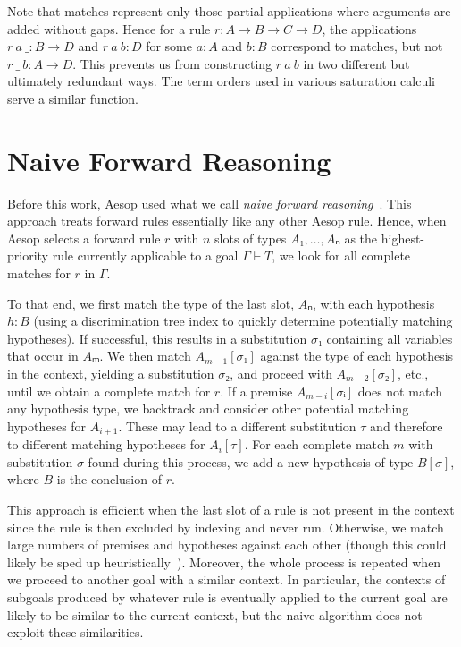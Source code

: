 \documentclass[runningheads,leqno]{llncs}
\begin{document}
Note that matches represent only those partial applications where arguments are added without gaps.
Hence for a rule $r : A → B → C → D$, the applications $r~a~\_ : B \to D$ and $r~a~b : D$ for some $a : A$ and $b : B$ correspond to matches, but not $r~\_~b : A \to D$.
This prevents us from constructing $r~a~b$ in two different but ultimately redundant ways.
The term orders used in various saturation calculi serve a similar function.

\section{Naive Forward Reasoning}%
\label{sec:naive}

Before this work, Aesop used what we call \emph{naive forward reasoning}~\cite{Aesop}.
This approach treats forward rules essentially like any other Aesop rule.
Hence, when Aesop selects a forward rule $r$ with $n$ slots of types $A₁, \dots, Aₙ$ as the highest-priority rule currently applicable to a goal $Γ ⊢ T$, we look for all complete matches for $r$ in $Γ$.

To that end, we first match the type of the last slot, $Aₙ$, with each hypothesis $h : B$ (using a discrimination tree index to quickly determine potentially matching hypotheses).
If successful, this results in a substitution $σ₁$ containing all variables that occur in $Aₘ$.
We then match $A_{m-1}[σ₁]$ against the type of each hypothesis in the context, yielding a substitution $σ₂$, and proceed with $A_{m-2}[σ₂]$, etc., until we obtain a complete match for $r$.
If a premise $A_{m-i}[σᵢ]$ does not match any hypothesis type, we backtrack and consider other potential matching hypotheses for $A_{i+1}$.
These may lead to a different substitution $τ$ and therefore to different matching hypotheses for $A_{i}[τ]$.
For each complete match $m$ with substitution $σ$ found during this process, we add a new hypothesis of type $B[σ]$, where $B$ is the conclusion of $r$.

This approach is efficient when the last slot of a rule is not present in the context since the rule is then excluded by indexing and never run.
Otherwise, we match large numbers of premises and hypotheses against each other (though this could likely be sped up heuristically~\cite{TammetSubsumption}).
Moreover, the whole process is repeated when we proceed to another goal with a similar context.
In particular, the contexts of subgoals produced by whatever rule is eventually applied to the current goal are likely to be similar to the current context, but the naive algorithm does not exploit these similarities.
\end{document}
